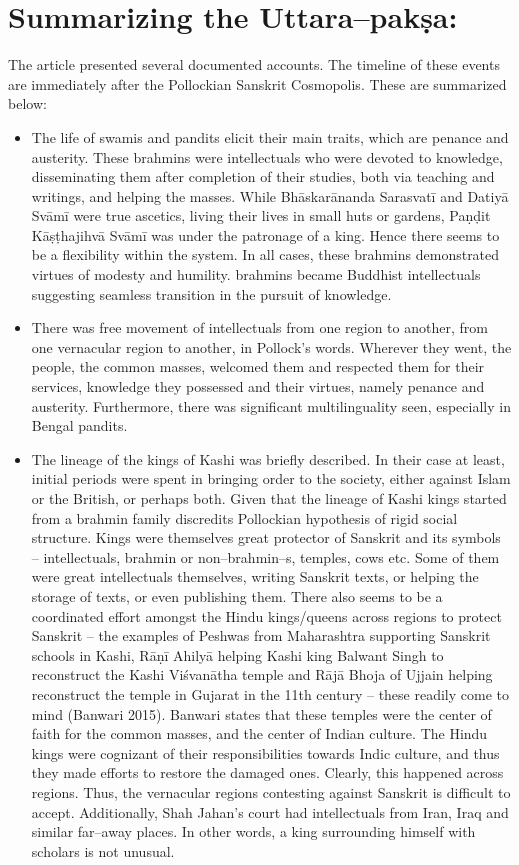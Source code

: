 \section*{Summarizing the Uttara–pakṣa:}

The article presented several documented accounts. The timeline of these events are immediately after the Pollockian Sanskrit Cosmopolis. These are summarized below:

\begin{itemize}
\item The life of swamis and pandits elicit their main traits, which are penance and austerity. These brahmins were intellectuals who were devoted to knowledge, disseminating them after completion of their studies, both via teaching and writings, and helping the masses. While Bhāskarānanda Sarasvatī and Datiyā Svāmī were true ascetics, living their lives in small huts or gardens, Paṇḍit Kāṣṭhajihvā Svāmī was under the patronage of a king. Hence there seems to be a flexibility within the system. In all cases, these brahmins demonstrated virtues of modesty and humility. brahmins became Buddhist intellectuals suggesting seamless transition in the pursuit of knowledge.

 \item There was free movement of intellectuals from one region to another, from one vernacular region to another, in Pollock's words. Wherever they went, the people, the common masses, welcomed them and respected them for their services, knowledge they possessed and their virtues, namely penance and austerity. Furthermore, there was significant multilinguality seen, especially in Bengal pandits.

 \item The lineage of the kings of Kashi was briefly described. In their case at least, initial periods were spent in bringing order to the society, either against Islam or the British, or perhaps both. Given that the lineage of Kashi kings started from a brahmin family discredits Pollockian hypothesis of rigid social structure. Kings were themselves great protector of Sanskrit and its symbols – intellectuals, brahmin or non–brahmin–s, temples, cows etc. Some of them were great intellectuals themselves, writing Sanskrit texts, or helping the storage of texts, or even publishing them. There also seems to be a coordinated effort amongst the Hindu kings/queens across regions to protect Sanskrit – the examples of Peshwas from Maharashtra supporting Sanskrit schools in Kashi, Rāṇī Ahilyā helping Kashi king Balwant Singh to reconstruct the Kashi Viśvanātha temple and Rājā Bhoja of Ujjain helping reconstruct the temple in Gujarat in the 11th century – these readily come to mind (Banwari 2015). Banwari states that these temples were the center of faith for the common masses, and the center of Indian culture. The Hindu kings were cognizant of their responsibilities towards Indic culture, and thus they made efforts to restore the damaged ones. Clearly, this happened across regions. Thus, the vernacular regions contesting against Sanskrit is difficult to accept. Additionally, Shah Jahan’s court had intellectuals from Iran, Iraq and similar far–away places. In other words, a king surrounding himself with scholars is not unusual.


\end{itemize}
